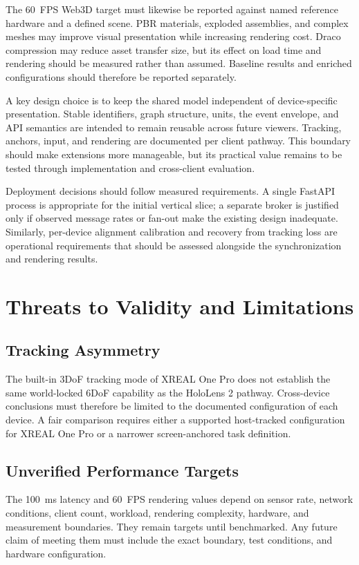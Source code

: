 \documentclass[conference]{IEEEtran}
\begin{document}
The 60~FPS Web3D target must likewise be reported against named reference hardware and a defined scene. PBR materials, exploded assemblies, and complex meshes may improve visual presentation while increasing rendering cost. Draco compression may reduce asset transfer size, but its effect on load time and rendering should be measured rather than assumed. Baseline results and enriched configurations should therefore be reported separately.

A key design choice is to keep the shared model independent of device-specific presentation. Stable identifiers, graph structure, units, the event envelope, and API semantics are intended to remain reusable across future viewers. Tracking, anchors, input, and rendering are documented per client pathway. This boundary should make extensions more manageable, but its practical value remains to be tested through implementation and cross-client evaluation.

Deployment decisions should follow measured requirements. A single FastAPI process is appropriate for the initial vertical slice; a separate broker is justified only if observed message rates or fan-out make the existing design inadequate. Similarly, per-device alignment calibration and recovery from tracking loss are operational requirements that should be assessed alongside the synchronization and rendering results.

\section{Threats to Validity and Limitations}
\subsection{Tracking Asymmetry}
The built-in 3DoF tracking mode of XREAL One Pro does not establish the same world-locked 6DoF capability as the HoloLens 2 pathway. Cross-device conclusions must therefore be limited to the documented configuration of each device. A fair comparison requires either a supported host-tracked configuration for XREAL One Pro or a narrower screen-anchored task definition.

\subsection{Unverified Performance Targets}
The 100~ms latency and 60~FPS rendering values depend on sensor rate, network conditions, client count, workload, rendering complexity, hardware, and measurement boundaries. They remain targets until benchmarked. Any future claim of meeting them must include the exact boundary, test conditions, and hardware configuration.
\end{document}
